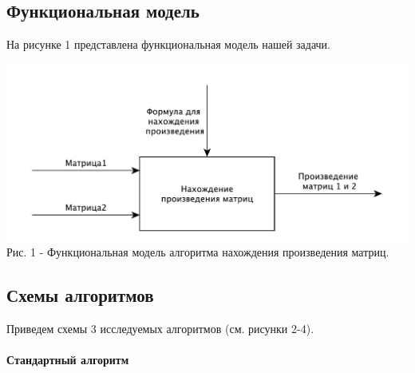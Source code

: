 \documentclass[a4paper,14pt]{article} %
\begin{document}
	\subsection{Функциональная модель}
	На рисунке 1 представлена функциональная модель нашей задачи.  
	\begin{center}
		\includegraphics[scale = 0.8]{idef0} \\ Рис.  1 - Функциональная модель алгоритма нахождения произведения матриц. 
	\end{center}
	
        
        \subsection{Схемы алгоритмов}
        \hfill
        
        Приведем схемы 3 исследуемых алгоритмов (см. рисунки 2-4). 
        
        \hfill
        \paragraph{Стандартный алгоритм}
        
\end{document}
